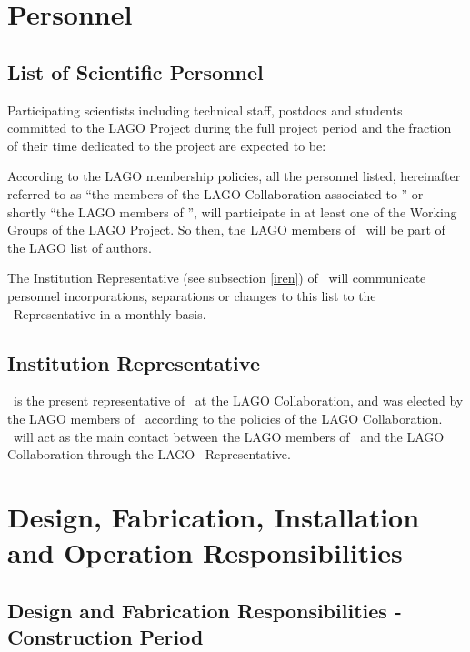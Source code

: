 \section{Personnel}

\subsection{List of Scientific Personnel}

Participating scientists including technical staff, postdocs and students
committed to the LAGO Project during the full project period and the fraction
of their time dedicated to the project are expected to be:



According to the LAGO membership policies, all the personnel listed,
hereinafter referred to as ``the members of the LAGO Collaboration associated
to \institution'' or shortly ``the LAGO members of \institution'', will
participate in at least one of the Working Groups of the LAGO Project. So then,
the LAGO members of \institution~will be part of the LAGO list of authors. 

The Institution Representative (see subsection \ref{iren}) of \institution~will
communicate personnel incorporations, separations or changes to this list to
the \country~Representative in a monthly basis.

\subsection{Institution Representative\label{iren}}

\instrep~is the present representative of \institution~at the LAGO
Collaboration, and was elected by the LAGO members of \institution~according to
the policies of the LAGO Collaboration. \instrep~will act as the main contact
between the LAGO members of \institution~and the LAGO Collaboration through the
LAGO \country~Representative. 

\section{Design, Fabrication, Installation and Operation Responsibilities}

\subsection{Design and Fabrication Responsibilities - Construction Period}

